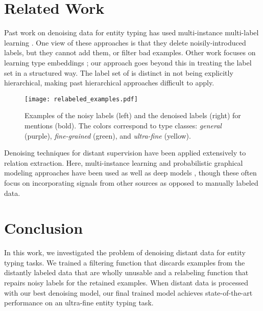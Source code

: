 \documentclass[11pt,a4paper]{article}
\begin{document}
\section{Related Work}

Past work on denoising data for entity typing has used multi-instance multi-label learning \cite{Yaghoobzadeh15, Yaghoobzadeh17, Murty18}. One view of these approaches is that they delete noisily-introduced labels, but they cannot add them, or filter bad examples. Other work focuses on learning type embeddings \cite{Yogatama15,Xiang_Ren_16a, Xiang_Ren_16b}; our approach goes beyond this in treating the label set in a structured way. The label set of \citet{Eunsol_Choi_18} is distinct in not being explicitly hierarchical, making past hierarchical approaches difficult to apply.




\begin{figure}[t]
    \centering
    \texttt{[image: relabeled\_examples.pdf]}
    \caption{Examples of the noisy labels (left) and the denoised labels (right) for mentions (bold). The colors correspond to type classes: {\it general} (purple), {\it fine-grained} (green), and {\it ultra-fine} (yellow).}
    \label{fig:relabel_ex}
\end{figure}




Denoising techniques for distant supervision have been applied extensively to relation extraction. Here, multi-instance learning and probabilistic graphical modeling approaches have been used \cite{Sebastian_Riedel10, Raphael_Hoffmann11, Mihai_Surdeanu12, Shingo_Takamatsu_12} as well as deep models \cite{Yankai_Lin16, Xiaocheng_Feng17, Bingfeng_Luo17, Kai_Lei18, Xu_Han18}, though these often focus on incorporating signals from other sources as opposed to manually labeled data.




\section{Conclusion}

In  this  work,  we investigated the problem of denoising distant data for entity typing tasks. We trained a filtering function that discards examples from the distantly labeled data that are wholly unusable and a relabeling function that repairs noisy labels for the retained examples. When distant data is processed with our best denoising model, our final trained model achieves state-of-the-art performance on an ultra-fine entity typing task.
\end{document}

